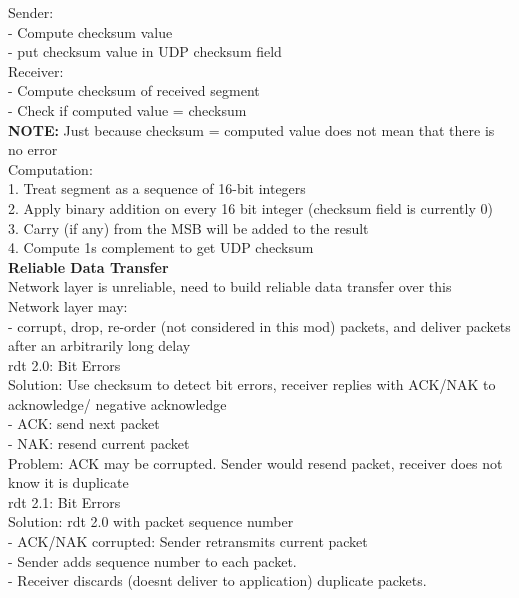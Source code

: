 \documentclass[10pt, a4paper]{article}
\newcommand{\highlight}[1]{{\color{red}\textbf{#1}}}
\newcommand{\blue}[1]{{\color{MidnightBlue}#1}}
\newcommand{\red}[1]{{\color{red}#1}}
\newcommand{\green}[1]{{\color{ForestGreen}#1}}
\begin{document}
\begin{multicols*}{3}
		Sender:\\
		- Compute checksum value\\
		- put checksum value in UDP checksum field\\
		Receiver:\\
		- Compute checksum of received segment\\
		- Check if computed value = checksum\\
		\highlight{NOTE:} Just because checksum = computed value \red{does not} mean that there is no error\\

		Computation:\\
		1. Treat segment as a sequence of \blue{16-bit} integers\\
		2. Apply binary addition on every 16 bit integer (checksum field is currently 0)\\
		3. Carry (if any) from the MSB will be added to the result\\
		4. Compute 1s complement to get UDP checksum\\

		\textbf{Reliable Data Transfer}\\
		Network layer is \red{unreliable}, need to build reliable data transfer over this\\
		Network layer may:\\
		- corrupt, drop, re-order (not considered in this mod) packets, and deliver packets after an arbitrarily long delay\\

		rdt 2.0: \red{Bit Errors}\\
		\green{Solution:} Use checksum to detect bit errors, receiver replies with \blue{ACK/NAK} to acknowledge/ negative acknowledge\\
		- ACK: send next packet\\
		- NAK: resend current packet\\
		\red{Problem:} ACK may be corrupted. Sender would resend packet, receiver does not know it is duplicate\\

		rdt 2.1: \red{Bit Errors}\\
		\green{Solution:} rdt 2.0 with packet sequence number\\
		- ACK/NAK corrupted: Sender retransmits current packet\\
		- Sender adds sequence number to each packet.\\
		- Receiver discards (doesnt deliver to application) duplicate packets.\\


\end{multicols*}
\end{document}
